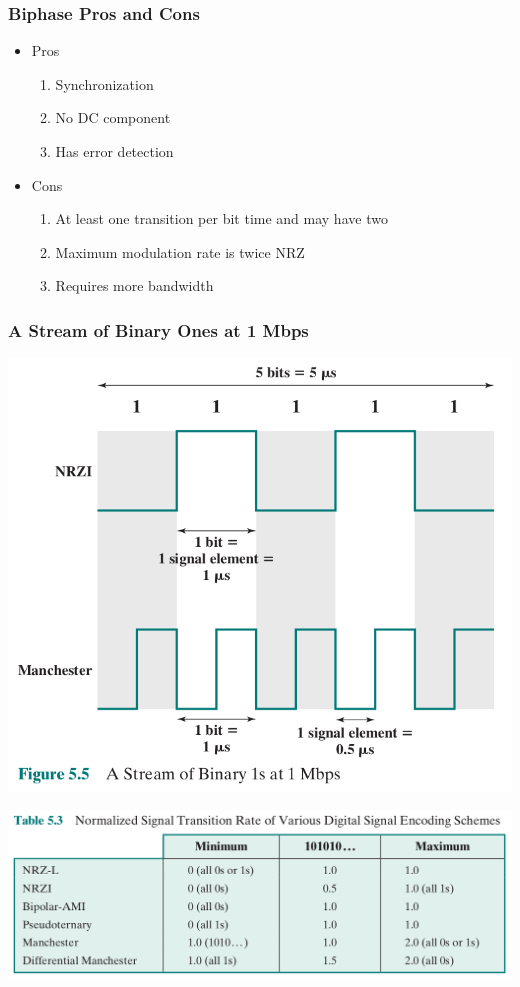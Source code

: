 \documentclass[pdflatex,compress]{beamer}
\begin{document}
\begin{frame}
	\frametitle{Biphase Pros and Cons}
	\begin{itemize}
		\item Pros
		\begin{enumerate}
			\item Synchronization
			\item No DC component
			\item Has error detection
		\end{enumerate}
		\item Cons
		\begin{enumerate}
			\item At least one transition per bit time and may have two
			\item Maximum modulation rate is twice NRZ
			\item Requires more bandwidth
		\end{enumerate}
	\end{itemize}
\end{frame}

\begin{frame}
	\frametitle{A Stream of Binary Ones at 1 Mbps}
	\begin{center}
		\includegraphics[width=0.7\linewidth]{img/img07}
	\end{center}
\end{frame}

\begin{frame}
	\begin{center}
		\includegraphics[width=\linewidth]{img/img08}
	\end{center}
\end{frame}
\end{document}
